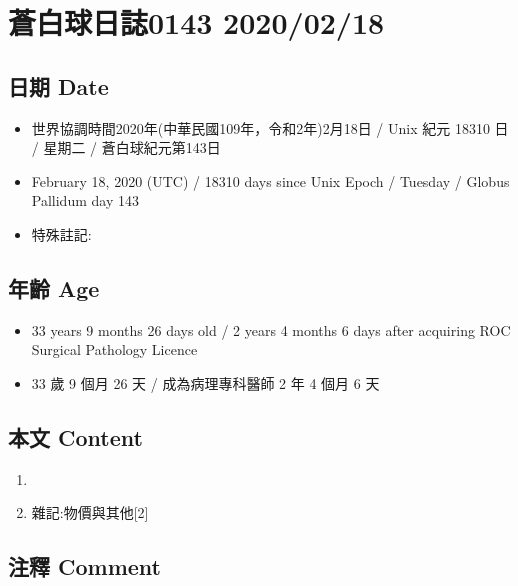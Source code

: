 \documentclass[
]{article}
\providecommand{\tightlist}{%
  \setlength{\itemsep}{0pt}\setlength{\parskip}{0pt}}
\begin{document}
\hypertarget{ux84bcux767dux7403ux65e5ux8a8c0143-20200218}{%
\section{蒼白球日誌0143
2020/02/18}\label{ux84bcux767dux7403ux65e5ux8a8c0143-20200218}}

\hypertarget{ux65e5ux671f-date-79}{%
\subsection{日期 Date}\label{ux65e5ux671f-date-79}}

\begin{itemize}
\tightlist
\item
  世界協調時間2020年(中華民國109年，令和2年)2月18日 / Unix 紀元 18310 日
  / 星期二 / 蒼白球紀元第143日
\item
  February 18, 2020 (UTC) / 18310 days since Unix Epoch / Tuesday /
  Globus Pallidum day 143
\item
  特殊註記:
\end{itemize}

\hypertarget{ux5e74ux9f61-age-79}{%
\subsection{年齡 Age}\label{ux5e74ux9f61-age-79}}

\begin{itemize}
\tightlist
\item
  33 years 9 months 26 days old / 2 years 4 months 6 days after
  acquiring ROC Surgical Pathology Licence
\item
  33 歲 9 個月 26 天 / 成為病理專科醫師 2 年 4 個月 6 天
\end{itemize}

\hypertarget{ux672cux6587-content-79}{%
\subsection{本文 Content}\label{ux672cux6587-content-79}}

\begin{enumerate}
\def\labelenumi{\arabic{enumi}.}
\item
\item
  雜記:物價與其他{[}2{]}
\end{enumerate}

\hypertarget{ux6ce8ux91cb-comment-78}{%
\subsection{注釋 Comment}\label{ux6ce8ux91cb-comment-78}}
\end{document}
